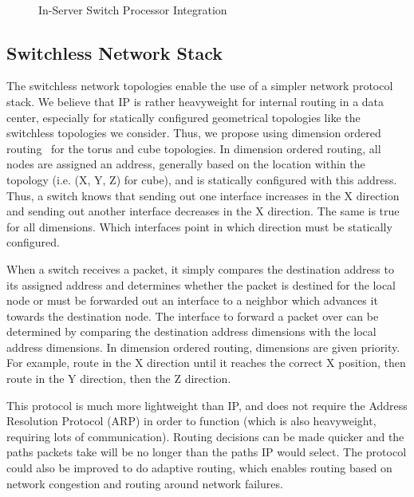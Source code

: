 \begin{figure}
    \centering
    ~
    \vspace{-0.07in}
    \caption{In-Server Switch Processor Integration}
    \label{fig:in_server_switch_design}
\end{figure}

\subsection{Switchless Network Stack}
\label{stack}
The switchless network topologies enable the use of a simpler network protocol stack.  We believe that IP is rather heavyweight for internal routing in a data center, especially for statically configured geometrical topologies like the switchless topologies we consider.  Thus, we propose using dimension ordered routing~\cite{Ni:1993:SWRTDN} for the torus and cube topologies.  In dimension ordered routing, all nodes are assigned an address, generally based on the location within the topology (i.e. (X, Y, Z) for cube), and is statically configured with this address.  Thus, a switch knows that sending out one interface increases in the X direction and sending out another interface decreases in the X direction.  The same is true for all dimensions.  Which interfaces point in which direction must be statically configured.  

When a switch receives a packet, it simply compares the destination address to its assigned address and determines whether the packet is destined for the local node or must be forwarded out an interface to a neighbor which advances it towards the destination node.  The interface to forward a packet over can be determined by comparing the destination address dimensions with the local address dimensions.  In dimension ordered routing, dimensions are given priority.  For example, route in the X direction until it reaches the correct X position, then route in the Y direction, then the Z direction.

This protocol is much more lightweight than IP, and does not require the Address Resolution Protocol (ARP) in order to function (which is also heavyweight, requiring lots of communication).  Routing decisions can be made quicker and the paths packets take will be no longer than the paths IP would select.  The protocol could also be improved to do adaptive routing, which enables routing based on network congestion and routing around network failures.  

